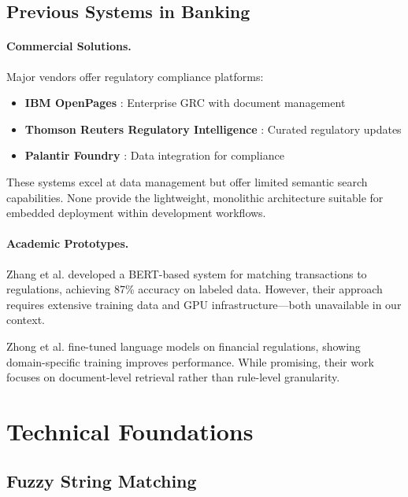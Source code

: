 \subsection{Previous Systems in Banking}

\paragraph{Commercial Solutions.} Major vendors offer regulatory compliance platforms:
\begin{itemize}[leftmargin=*,itemsep=2pt,topsep=2pt]
 \item \textbf{IBM OpenPages} \cite{ibm2022openpages}: Enterprise GRC with document management
 \item \textbf{Thomson Reuters Regulatory Intelligence} \cite{thomson2022regulatory}: Curated regulatory updates
 \item \textbf{Palantir Foundry} \cite{palantir2022foundry}: Data integration for compliance
\end{itemize}

These systems excel at data management but offer limited semantic search capabilities. None provide the lightweight, monolithic architecture suitable for embedded deployment within development workflows.

\paragraph{Academic Prototypes.} Zhang et al. \cite{zhang2020regulatory} developed a BERT-based system for matching transactions to regulations, achieving 87\% accuracy on labeled data. However, their approach requires extensive training data and GPU infrastructure—both unavailable in our context.

Zhong et al. \cite{zhong2021does} fine-tuned language models on financial regulations, showing domain-specific training improves performance. While promising, their work focuses on document-level retrieval rather than rule-level granularity.

\section{Technical Foundations}

\subsection{Fuzzy String Matching}

